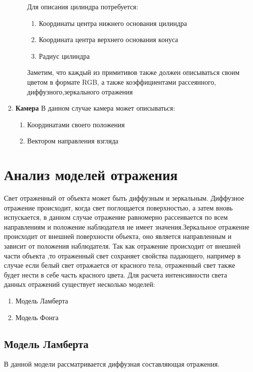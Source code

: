 \begin{enumerate}
\begin{enumerate}
		Для описания цилиндра потребуется:
		\begin{enumerate}
			\item Координаты центра нижнего основания цилиндра
			\item Координата центра верхнего основания конуса
			\item Радиус цилиндра
		\end{enumerate}
		Заметим, что каждый из примитивов также должен описываться своим цветом в формате RGB, а также
		коэффициентами рассеянного, диффузного,зеркального отражения
	\end{enumerate}

	\item \textbf{Камера}
	В данном случае камера может описываться:
	\begin{enumerate}
		\item Координатами своего положения
		\item Вектором направления взгляда
	\end{enumerate}
	
\end{enumerate}

\section[Анализ моделей отражения]{Анализ моделей отражения}
\label{sec:reflection_models}
Свет отраженный от объекта может быть диффузным и зеркальным.
Диффузное отражение происходит, когда свет поглощается поверхностью, а затем вновь испускается, в данном случае
отражение равномерно рассеивается по всем направлениям и положение наблюдателя не имеет значения.Зеркальное отражение
происходит от внешней поверхности объекта, оно является направленным и зависит от положения наблюдателя.
Так как отражение происходит от внешней части объекта ,то отраженный свет сохраняет свойства падающего, например в случае если белый свет отражается
от красного тела, отраженный свет также будет нести в себе часть красного цвета.
Для расчета интенсивности света данных отражений существует несколько моделей:\cite{Rodgers}
\begin{enumerate}
	\item Модель Ламберта
	\item Модель Фонга
\end{enumerate}

\subsection{Модель Ламберта}
В данной модели рассматривается диффузная составляющая отражения.

